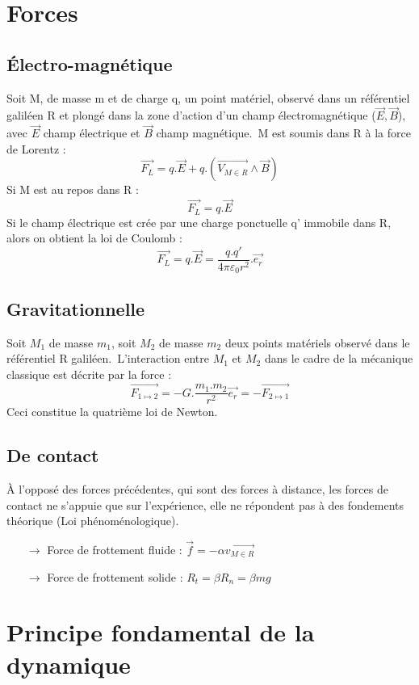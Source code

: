 \section{Forces}

\subsection{\'Electro-magnétique}

Soit M, de masse m et de charge q, un point matériel, observé dans un référentiel galiléen R et plongé dans la zone d'action d'un champ électromagnétique ($\vec{E},\vec{B}$), avec $\vec{E}$ champ électrique et $\vec{B}$ champ magnétique.\
M est soumis dans R à la force de Lorentz :
$$\vec{F_L} = q.\vec{E} + q.(\vec{V_{M \in R}}\wedge\vec{B})$$
Si M est au repos dans R :
$$\vec{F_L} = q.\vec{E}$$
Si le champ électrique est crée par une charge ponctuelle q' immobile dans R, alors on obtient la loi de Coulomb : 
$$\vec{F_L} = q.\vec{E} = \dfrac{q.q'}{4\pi\varepsilon_0r^2}.\vec{e_r}$$

\subsection{Gravitationnelle}

Soit $M_1$ de masse $m_1$, soit $M_2$ de masse $m_2$ deux points matériels observé dans le référentiel R galiléen.\
L'interaction entre $M_1$ et $M_2$ dans le cadre de la mécanique classique est décrite par la force :
$$\vec{F_{1 \mapsto 2}} = -G.\dfrac{m_1.m_2}{r^2}\vec{e_r} = -\vec{F_{2 \mapsto 1}}$$
Ceci constitue la quatrième loi de Newton.

\subsection{De contact}

À l'opposé des forces précédentes, qui sont des forces à distance, les forces de contact ne s'appuie que sur l'expérience, elle ne répondent pas à des fondements théorique (Loi phénoménologique).
\begin{itemize}
 \item[$\rightarrow$] Force de frottement fluide : $\vec{f}=-\alpha \vec{v_{M \in R}}$
 \item[$\rightarrow$] Force de frottement solide : $R_t = \beta R_n = \beta mg$
\end{itemize}

\section{Principe fondamental de la dynamique}

